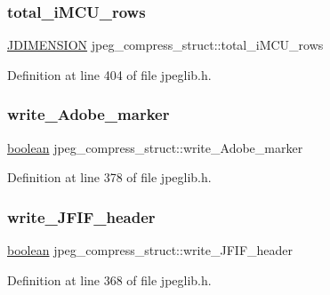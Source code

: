 \subsubsection{\texorpdfstring{total\_iMCU\_rows}{total\_iMCU\_rows}}
{\footnotesize\ttfamily \mbox{\hyperlink{jmorecfg_8h_a04ed4674f6f1d0d50ec241531e38274f}{J\+D\+I\+M\+E\+N\+S\+I\+ON}} jpeg\+\_\+compress\+\_\+struct\+::total\+\_\+i\+M\+C\+U\+\_\+rows}



Definition at line 404 of file jpeglib.\+h.

\mbox{\label{structjpeg__compress__struct_a39c549a441052b38df2dfd7359c68814}} 
\subsubsection{\texorpdfstring{write\_Adobe\_marker}{write\_Adobe\_marker}}
{\footnotesize\ttfamily \mbox{\hyperlink{jmorecfg_8h_a7c6368b321bd9acd0149b030bb8275ed}{boolean}} jpeg\+\_\+compress\+\_\+struct\+::write\+\_\+\+Adobe\+\_\+marker}



Definition at line 378 of file jpeglib.\+h.

\mbox{\label{structjpeg__compress__struct_a12178443b9177fd4bdddc66ce4e08e12}} 
\subsubsection{\texorpdfstring{write\_JFIF\_header}{write\_JFIF\_header}}
{\footnotesize\ttfamily \mbox{\hyperlink{jmorecfg_8h_a7c6368b321bd9acd0149b030bb8275ed}{boolean}} jpeg\+\_\+compress\+\_\+struct\+::write\+\_\+\+J\+F\+I\+F\+\_\+header}



Definition at line 368 of file jpeglib.\+h.

\mbox{\label{structjpeg__compress__struct_adef3c4b809ebca2a853b5659e177deaa}} 
